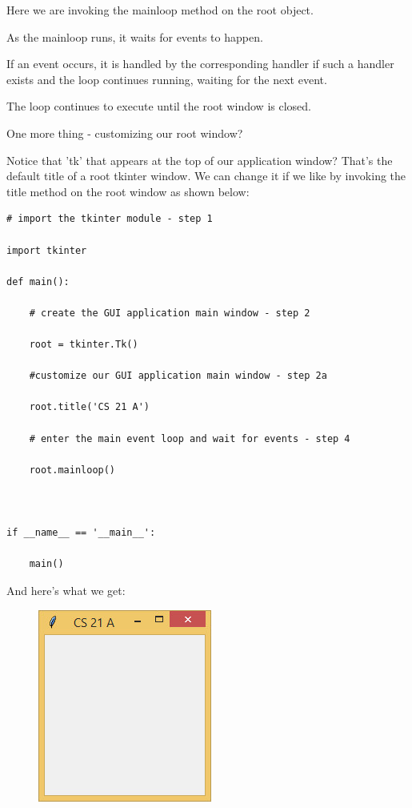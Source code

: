 \documentclass{article}
\begin{document}
Here we are invoking the mainloop method on the root object.

As the mainloop runs, it waits for events to happen. 

If an event occurs, it is handled by the corresponding handler if such a handler exists and the loop continues running, waiting for the next event. 

The loop continues to execute until the root window is closed.

One more thing - customizing our root window?

Notice that 'tk' that appears at the top of our application window?  That's the default title of a root tkinter window.  We can change it if we like by invoking the title method on the root window as shown below:

\begin{lstlisting}
# import the tkinter module - step 1

import tkinter

def main():

    # create the GUI application main window - step 2

    root = tkinter.Tk()

    #customize our GUI application main window - step 2a

    root.title('CS 21 A')

    # enter the main event loop and wait for events - step 4

    root.mainloop()

 

if __name__ == '__main__':

    main()
\end{lstlisting}

And here's what we get:
\begin{figure}[h]
\includegraphics[scale=.6]{rootwtitle}\\
\end{figure}
\end{document}
